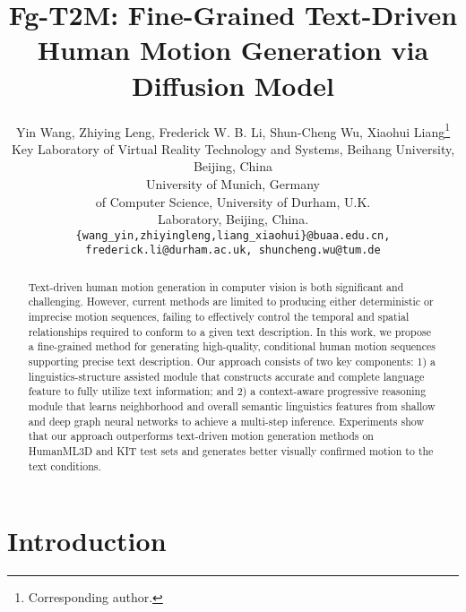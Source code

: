 \documentclass[10pt,twocolumn,letterpaper]{article}
\begin{document}
\title{Fg-T2M: Fine-Grained Text-Driven Human Motion Generation via Diffusion Model}



\author{Yin Wang,
Zhiying Leng,
Frederick W. B. Li,
Shun-Cheng Wu, 
Xiaohui Liang\thanks{Corresponding author.} \\ [2mm]
\smallState Key Laboratory of Virtual Reality Technology and Systems, Beihang University, Beijing, China\\
\smallTechnical University of Munich, Germany\\
\smallDepartment of Computer Science, University of Durham, U.K.\\
\smallZhongguancun Laboratory, Beijing, China.
\\
{\tt\small \{wang\_yin,zhiyingleng,liang\_xiaohui\}@buaa.edu.cn, frederick.li@durham.ac.uk, shuncheng.wu@tum.de}
}


\maketitle
\ificcvfinal\thispagestyle{empty}\fi


\begin{abstract}

   Text-driven human motion generation in computer vision is both significant and challenging. However, current methods are limited to producing either deterministic or imprecise motion sequences, failing to effectively control the temporal and spatial relationships required to conform to a given text description. In this work, we propose a fine-grained method for generating high-quality, conditional human motion sequences supporting precise text description. Our approach consists of two key components: 1) a linguistics-structure assisted module that constructs accurate and complete language feature to fully utilize text information; and 2) a context-aware progressive reasoning module that learns neighborhood and overall semantic linguistics features from shallow and deep graph neural networks to achieve a multi-step inference. Experiments show that our approach outperforms text-driven motion generation methods on HumanML3D and KIT test sets and generates better visually confirmed motion to the text conditions.


\end{abstract}







\section{Introduction}
\end{document}
